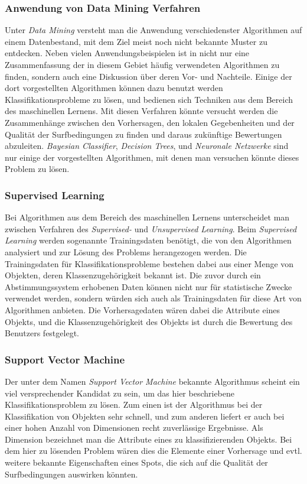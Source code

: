 \subsubsection{Anwendung von Data Mining Verfahren}
Unter \textit{Data Mining} versteht man die Anwendung verschiedenster
Algorithmen auf einem Datenbestand, mit dem Ziel meist noch nicht
bekannte Muster zu entdecken. Neben vielen Anwendungsbeispielen ist in
\cite{Seagaran2007} nicht nur eine Zusammenfassung der in diesem
Gebiet häufig verwendeten Algorithmen zu finden, sondern auch eine
Diskussion über deren Vor- und Nachteile. Einige der dort
vorgestellten Algorithmen können dazu benutzt werden
Klassifikationsprobleme zu lösen, und bedienen sich Techniken aus dem
Bereich des maschinellen Lernens. Mit diesen Verfahren könnte versucht
werden die Zusammenhänge zwischen den Vorhersagen, den lokalen
Gegebenheiten und der Qualität der Surfbedingungen zu finden und
daraus zukünftige Bewertungen abzuleiten. \textit{Bayesian
  Classifier}, \textit{Decision Trees}, und \textit{Neuronale
  Netzwerke} sind nur einige der vorgestellten Algorithmen, mit denen
man versuchen könnte dieses Problem zu lösen.

\subsubsection{Supervised Learning}
Bei Algorithmen aus dem Bereich des maschinellen Lernens unterscheidet
man zwischen Verfahren des \textit{Supervised-} und
\textit{Unsupervised Learning}. Beim \textit{Supervised Learning}
werden sogenannte Trainingsdaten benötigt, die von den Algorithmen
analysiert und zur Lösung des Problems herangezogen werden. Die
Trainingsdaten für Klassifikationsprobleme bestehen dabei aus einer
Menge von Objekten, deren Klassenzugehörigkeit bekannt ist. Die zuvor
durch ein Abstimmungssystem erhobenen Daten können nicht nur für
statistische Zwecke verwendet werden, sondern würden sich auch als
Trainingsdaten für diese Art von Algorithmen anbieten. Die
Vorhersagedaten wären dabei die Attribute eines Objekts, und die
Klassenzugehörigkeit des Objekts ist durch die Bewertung des Benutzers
festgelegt.

\subsubsection{Support Vector Machine}
Der unter dem Namen \textit{Support Vector Machine} bekannte
Algorithmus scheint ein viel versprechender Kandidat zu sein, um das
hier beschriebene Klassifikationsproblem zu lösen. Zum einen ist der
Algorithmus bei der Klassifikation von Objekten sehr schnell, und zum
anderen liefert er auch bei einer hohen Anzahl von Dimensionen recht
zuverlässige Ergebnisse. Als Dimension bezeichnet man die Attribute
eines zu klassifizierenden Objekts. Bei dem hier zu lösenden Problem
wären dies die Elemente einer Vorhersage und evtl. weitere bekannte
Eigenschaften eines Spots, die sich auf die Qualität der
Surfbedingungen auswirken könnten.


